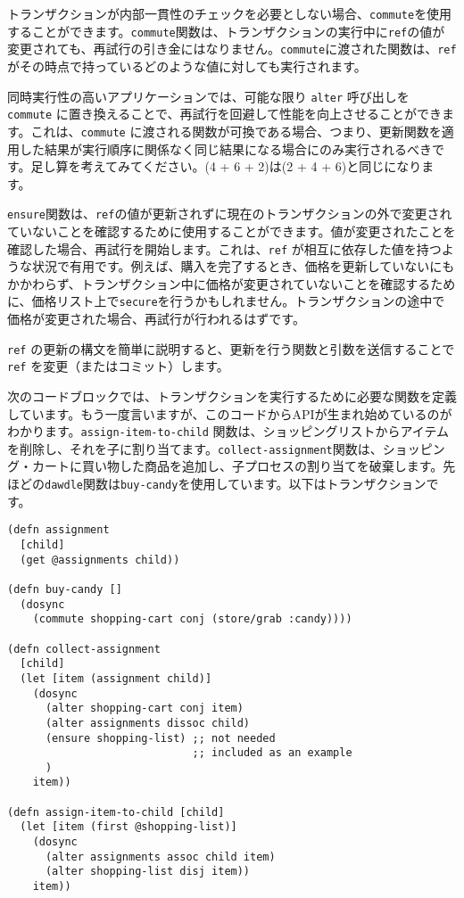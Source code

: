 トランザクションが内部一貫性のチェックを必要としない場合、\texttt{commute}を使用することができます。\texttt{commute}関数は、トランザクションの実行中に\texttt{ref}の値が変更されても、再試行の引き金にはなりません。\texttt{commute}に渡された関数は、\texttt{ref}がその時点で持っているどのような値に対しても実行されます。

同時実行性の高いアプリケーションでは、可能な限り \texttt{alter} 呼び出しを \texttt{commute} に置き換えることで、再試行を回避して性能を向上させることができます。これは、\texttt{commute} に渡される関数が可換である場合、つまり、更新関数を適用した結果が実行順序に関係なく同じ結果になる場合にのみ実行されるべきです。足し算を考えてみてください。(4 + 6 + 2)は(2 + 4 + 6)と同じになります。

\texttt{ensure}関数は、\texttt{ref}の値が更新されずに現在のトランザクションの外で変更されていないことを確認するために使用することができます。値が変更されたことを確認した場合、再試行を開始します。これは、\texttt{ref} が相互に依存した値を持つような状況で有用です。例えば、購入を完了するとき、価格を更新していないにもかかわらず、トランザクション中に価格が変更されていないことを確認するために、価格リスト上で\texttt{secure}を行うかもしれません。トランザクションの途中で価格が変更された場合、再試行が行われるはずです。

\texttt{ref} の更新の構文を簡単に説明すると、更新を行う関数と引数を送信することで \texttt{ref} を変更（またはコミット）します。

次のコードブロックでは、トランザクションを実行するために必要な関数を定義しています。もう一度言いますが、このコードからAPIが生まれ始めているのがわかります。\texttt{assign-item-to-child} 関数は、ショッピングリストからアイテムを削除し、それを子に割り当てます。\texttt{collect-assignment}関数は、ショッピング・カートに買い物した商品を追加し、子プロセスの割り当てを破棄します。先ほどの\texttt{dawdle}関数は\texttt{buy-candy}を使用しています。以下はトランザクションです。


\begin{lstlisting}[numbers=none]
(defn assignment
  [child]
  (get @assignments child))

(defn buy-candy []
  (dosync
    (commute shopping-cart conj (store/grab :candy))))

(defn collect-assignment
  [child]
  (let [item (assignment child)]
    (dosync
      (alter shopping-cart conj item)
      (alter assignments dissoc child)
      (ensure shopping-list) ;; not needed
                             ;; included as an example
      )
    item))

(defn assign-item-to-child [child]
  (let [item (first @shopping-list)]
    (dosync
      (alter assignments assoc child item)
      (alter shopping-list disj item))
    item))
\end{lstlisting}

